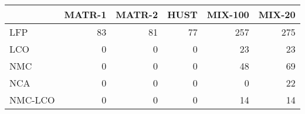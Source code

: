 \begin{tabular}{lrrrrr}
\toprule
 & MATR-1 & MATR-2 & HUST & MIX-100 & MIX-20 \\
\midrule
LFP & 83 & 81 & 77 & 257 & 275 \\
LCO & 0 & 0 & 0 & 23 & 23 \\
NMC & 0 & 0 & 0 & 48 & 69 \\
NCA & 0 & 0 & 0 & 0 & 22 \\
NMC-LCO & 0 & 0 & 0 & 14 & 14 \\
\bottomrule
\end{tabular}
